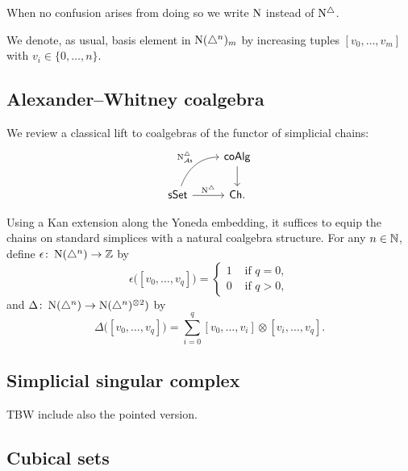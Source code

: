 When no confusion arises from doing so we write $\operatorname{N}$ instead of $\operatorname{N^{\triangle}}$.

We denote, as usual, basis element in $\operatorname{N}(\triangle^n)_m$ by increasing tuples $[v_0, \dots, v_m]$ with $v_i \in \{0, \dots, n\}$.

\subsection{Alexander--Whitney coalgebra} \label{ss:aw coalgebra}

We review a classical lift to coalgebras of the functor of simplicial chains:
\begin{equation*}
\begin{tikzcd}
& \coAlg \arrow[d] \\
\sSet \arrow[r, "\schains"] \arrow[ur, "\schainsAS", out=70, in=180] & \Ch.
\end{tikzcd}
\end{equation*}

Using a Kan extension along the Yoneda embedding, it suffices to equip the chains on standard simplices with a natural coalgebra structure.
For any $n \in \mathbb{N}$, define $\epsilon  \colon \operatorname{N}(\triangle^n) \to \mathbb{Z}$ by
\begin{equation*}
\epsilon \big( [v_0, \dots, v_q] \big) = \begin{cases} 1 & \text{ if } q = 0, \\ 0 & \text{ if } q>0, \end{cases}
\end{equation*}
and $\Delta \colon \operatorname{N}(\triangle^n) \to \operatorname{N}(\triangle^n)^{\otimes2})$ by
\begin{equation*}
\Delta \big( [v_0, \dots, v_q] \big) = \sum_{i=0}^q [v_0, \dots, v_i] \otimes [v_i, \dots, v_q].
\end{equation*}

\subsection{Simplicial singular complex}

TBW include also the pointed version.

\subsection{Cubical sets}

